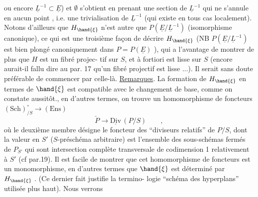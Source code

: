 
ou encore $\underline{L}^{-1}\subset\underline{E}$) et $\emptyset$ s'obtient en prenant une section de $\underline{L}^{-1}$ qui
ne s'annule en aucun point , i.e. une trivialisation de $\underline{L}^{-1}$
(qui existe en tous cas localement). Notons d'ailleurs que $H_{\hand{\xi}}$ n'est
autre que $P(\underline{E}/\underline{L}^{-1})$ (isomorphisme canonique), ce qui est une troisième
façon de décrire $H_{\hand{\xi}}$ (NB $P(\underline{E}/\underline{L}^{-1})$ est bien plongé canoniquement dans
$P = P(\underline{E})$ ), qui a l'avantage de montrer de plus que $H$ est un fibré projec-%
tif sur $S$, et à fortiori est lisse sur $S$ (encore aurait-il fallu dire 
 au par. 17 qu'un fibré projectif est lisse ...). Il serait sans doute
 préférable de commencer par celle-là.
\uline{Remarques}. La formation de $H_{\hand{\xi}}$ en termes de $\hand{\xi}$ est compatible avec
le changement de base, comme on constate aussitôt., en d'autres termes,
on trouve un homomorphisme de foncteurs $(\mathrm{Sch})^{\circ}_{/S}\to(\mathrm{Ens})$
\[ \check{P} \longrightarrow \underline{\mathrm{Div}}\,(P/S) \qquad , \]
où le deuxième membre désigne le foncteur des ``diviseurs relatifs'' de $P/S$,
dont la valeur en $S'$ ($S$-préschéma arbitraire) est l'ensemble des
sous-schémas fermés de $P_{S'}$ qui sont intersection complète transversale
de codimension 1 relativement à $S'$ (cf par.19). Il est facile de montrer
que cet homomorphisme de foncteurs est un monomorphisme, en d'autres
termes que $\hand{\xi}$ est déterminé par $H_{\hand{\xi}}$ . (Ce dernier fait justifie la termino-%
logie ``schéma des hyperplans'' utilisée plus haut). Nous verrons  
